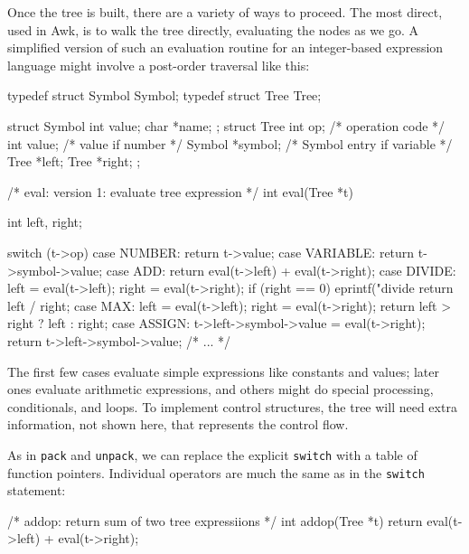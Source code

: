 Once the tree is built, there are a variety of ways to proceed. The most
direct, used in Awk, is to walk the tree directly, evaluating the nodes as
we go. A simplified version of such an evaluation routine for an
integer-based expression language might involve a post-order traversal like
this:
\begin{wellcode}
    typedef struct Symbol Symbol;
    typedef struct Tree Tree;

    struct Symbol {
        int     value;
        char    *name;
    };
    struct Tree {
        int     op;         /* operation code */
        int     value;      /* value if number */
        Symbol  *symbol;    /* Symbol entry if variable */
        Tree    *left;
        Tree    *right;
    };

    /* eval: version 1: evaluate tree expression */
    int eval(Tree *t)
    {
        int left, right;

        switch (t->op) {
        case NUMBER:
            return t->value;
        case VARIABLE:
            return t->symbol->value;
        case ADD:
            return eval(t->left) + eval(t->right);
        case DIVIDE:
            left = eval(t->left);
            right = eval(t->right);
            if (right == 0)
                eprintf("divide %
            return left / right;
        case MAX:
            left = eval(t->left);
            right = eval(t->right);
            return left > right ? left : right;
        case ASSIGN:
            t->left->symbol->value = eval(t->right);
            return t->left->symbol->value;
        /* ... */
        }
    }
\end{wellcode}
The first few cases evaluate simple expressions like constants and values;
later ones evaluate arithmetic expressions, and others might do special
processing, conditionals, and loops. To implement control structures, the
tree will need extra information, not shown here, that represents the
control flow.

As in \verb'pack' and \verb'unpack', we can replace the explicit
\verb'switch' with a table of function pointers. Individual operators are
much the same as in the \verb'switch' statement:
\begin{wellcode}
    /* addop: return sum of two tree expressiions */
    int addop(Tree *t)
    {
        return eval(t->left) + eval(t->right);
    }
\end{wellcode}

